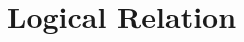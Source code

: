\documentclass[sigplan,review]{acmart}\settopmatter{printfolios=true,printccs=false,printacmref=false}
\newcommand{\sep}{-\kern-.6em\raisebox{-.659ex}{*}\ }
\newcommand{\interp}[2]{(#1)(#2)}
\begin{document}
\section{Logical Relation}



\end{document}
